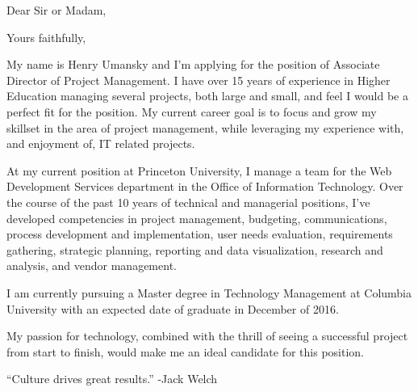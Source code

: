 \documentclass[12pt,a4paper,sans]{moderncv}        %
\begin{document}
\date{April 26, 2016}
\opening{Dear Sir or Madam,}
\closing{Yours faithfully,}
\makelettertitle

My name is Henry Umansky and I'm applying for the position of Associate Director of Project Management. I have over 15 years of experience in Higher Education managing several projects, both large and small, and feel I would be a perfect fit for the position. My current career goal is to focus and grow my skillset in the area of project management, while
leveraging my experience with, and enjoyment of, IT related projects.

At my current position at Princeton University, I manage a team for the Web Development Services department in the Office of Information Technology. Over the course of the past 10 years of technical and managerial positions, I’ve developed competencies in project management, budgeting, communications, process development and implementation, user needs evaluation, requirements gathering, strategic planning, reporting and data visualization, research and analysis, and vendor management.

I am currently pursuing a Master degree in Technology Management at Columbia University with an expected date of graduate in December of 2016.

My passion for technology, combined with the thrill of seeing a successful project from start to finish, would make me an ideal candidate for this position.

\begin{center}
``Culture drives great results.'' -Jack Welch
\end{center}

\makeletterclosing
\end{document}
